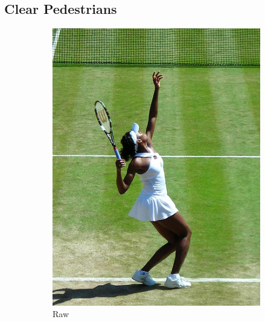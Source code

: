 \subsection{Clear Pedestrians}
\begin{figure}[!htbp]
\centering
\begin{subfigure}{.15\textwidth}
  \centering
  \includegraphics[width=\textwidth]{images/tennis.jpg}
  \caption{Raw}
  \label{fig:ogtennis}
\end{subfigure}%
\begin{subfigure}{.2\textwidth}
  \centering

\end{subfigure}
\end{figure}
